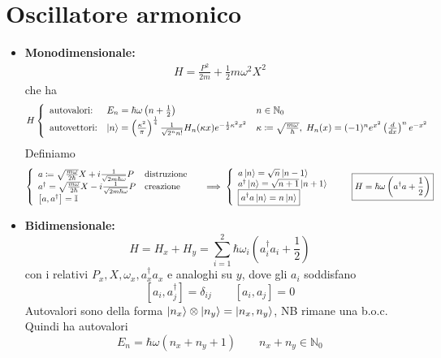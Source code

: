 \documentclass[a4paper,10pt]{article}
\theoremstyle{definition}
\newcommand{\na}{\mathbb{N}} %
\theoremstyle{indentdefinition}
\theoremstyle{indenttheorem}
\theoremstyle{myremark}
\theoremstyle{indentgeneral}
\begin{document}
\section{Oscillatore armonico}
\begin{itemize}
    \item \textbf{Monodimensionale:} 
    \begin{align*}
    \boxed{H=\frac{P^2}{2m}+\frac{1}{2}m\omega^2X^2}
\end{align*}
che ha $$H\left\{\begin{array}{lll}
       \text{autovalori:} & E_n=\hbar\omega\left(n+\frac{1}{2}\right) & n\in \na_0\\
    \text{autovettori:} & \ket{n}=\left(\frac{\kappa^2}{\pi}\right)^{\frac{1}{4}}\frac{1}{\sqrt{2^nn!}}H_n(\kappa x)e^{-\frac{1}{2}\kappa^2x^2} & \kappa\coloneqq\sqrt{\frac{m\omega}{\hbar}},\; H_n(x)=(-1)^ne^{x^2}\left(\frac{d}{dx}\right)^ne^{-x^2}\\
    \end{array}
    \right.$$
    Definiamo
    \begin{align*}
        \left\{\begin{array}{ll}
       a\coloneqq\sqrt{\frac{m\omega}{2\hbar}}X+i\frac{1}{\sqrt{2m\hbar\omega}}P & \text{distruzione}\\
       a^\dagger=\sqrt{\frac{m\omega}{2\hbar}}X-i\frac{1}{\sqrt{2m\hbar\omega}}P & \text{creazione}\\
       \left[a,a^\dagger\right]=\mathbb{I}  
    \end{array}
    \right.\quad \implies\left\{\begin{array}{lll}
       a\ket{n}=\sqrt{n}\ket{n-1}\\
       a^\dagger\ket{n}=\sqrt{n+1}\ket{n+1}\\
       \boxed{a^\dagger a\ket{n}=n\ket{n}}
    \end{array}
    \right. \qquad \boxed{H=\hbar\omega\left(a^\dagger a+\frac{1}{2}\right)}
    \end{align*}
    \item \textbf{Bidimensionale:}
    $$\boxed{H=H_x+H_y}=\sum_{i=1}^2\hbar\omega_i\left(a_i^\dagger a_i+\frac{1}{2}\right)$$
    con i relativi $P_x,X,\omega_x,a_x^\dagger a_x$ e analoghi su $y$, dove gli $a_i$ soddisfano
    $$\left[a_i,a_j^\dagger\right] =\delta_{ij}\qquad  \left[a_i,a_j\right] =0$$
    Autovalori sono della forma $\ket{n_x}\otimes\ket{n_y}=\ket{n_x,n_y}$, NB rimane una b.o.c. Quindi ha autovalori
    $$E_n=\hbar \omega(n_x+n_y+1)\qquad n_x+n_y\in  \na_0$$
\end{itemize}
\end{document}
